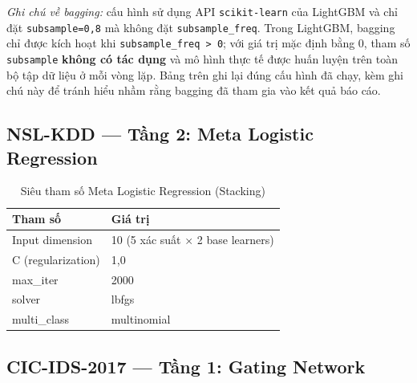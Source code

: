 \documentclass[../DoAn.tex]{subfiles}
\begin{document}
\textit{Ghi chú về bagging:} cấu hình sử dụng API \texttt{scikit-learn} của LightGBM và chỉ đặt \texttt{subsample=0,8} mà không đặt \texttt{subsample\_freq}. Trong LightGBM, bagging chỉ được kích hoạt khi \texttt{subsample\_freq > 0}; với giá trị mặc định bằng 0, tham số \texttt{subsample} \textbf{không có tác dụng} và mô hình thực tế được huấn luyện trên toàn bộ tập dữ liệu ở mỗi vòng lặp. Bảng trên ghi lại đúng cấu hình đã chạy, kèm ghi chú này để tránh hiểu nhầm rằng bagging đã tham gia vào kết quả báo cáo.

\subsection{NSL-KDD --- Tầng 2: Meta Logistic Regression}

\begin{table}[H]
    \centering
    \caption{Siêu tham số Meta Logistic Regression (Stacking)}
    \label{tab:hyp-meta}
    \begin{tabular}{ll}
        \hline
        \textbf{Tham số} & \textbf{Giá trị} \\
        \hline
        Input dimension & 10 (5 xác suất $\times$ 2 base learners) \\
        C (regularization) & 1,0 \\
        max\_iter & 2000 \\
        solver & lbfgs \\
        multi\_class & multinomial \\
        \hline
    \end{tabular}
\end{table}

\subsection{CIC-IDS-2017 --- Tầng 1: Gating Network}
\end{document}
